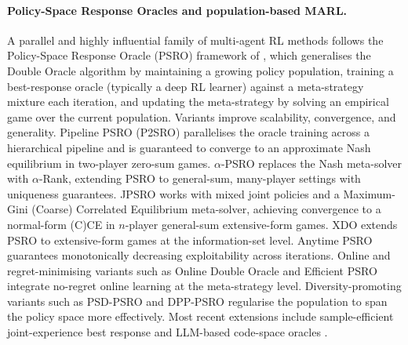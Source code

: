 \documentclass{article}
\begin{document}
\paragraph{Policy-Space Response Oracles and population-based MARL.}
A parallel and highly influential family of multi-agent RL methods follows the Policy-Space Response Oracle (PSRO) framework of \citet{lanctot2017unified}, which generalises the Double Oracle algorithm \citep{mcmahan2003planning} by maintaining a growing policy population, training a best-response oracle (typically a deep RL learner) against a meta-strategy mixture each iteration, and updating the meta-strategy by solving an empirical game over the current population. Variants improve scalability, convergence, and generality. Pipeline PSRO (P2SRO) \citep{mcaleer2020pipeline} parallelises the oracle training across a hierarchical pipeline and is guaranteed to converge to an approximate Nash equilibrium in two-player zero-sum games. $\alpha$-PSRO \citep{muller2019generalized} replaces the Nash meta-solver with $\alpha$-Rank, extending PSRO to general-sum, many-player settings with uniqueness guarantees. JPSRO \citep{marris2021multi} works with mixed joint policies and a Maximum-Gini (Coarse) Correlated Equilibrium meta-solver, achieving convergence to a normal-form (C)CE in $n$-player general-sum extensive-form games. XDO \citep{mcaleer2021xdo} extends PSRO to extensive-form games at the information-set level. Anytime PSRO \citep{mcaleer2022anytime} guarantees monotonically decreasing exploitability across iterations. Online and regret-minimising variants such as Online Double Oracle \citep{dinh2022online} and Efficient PSRO \citep{zhou2022efficient} integrate no-regret online learning at the meta-strategy level. Diversity-promoting variants such as PSD-PSRO \citep{yao2023policy} and DPP-PSRO regularise the population to span the policy space more effectively. Most recent extensions include sample-efficient joint-experience best response \citep{smith2026sample} and LLM-based code-space oracles \citep{hennes2026code}.
\end{document}
